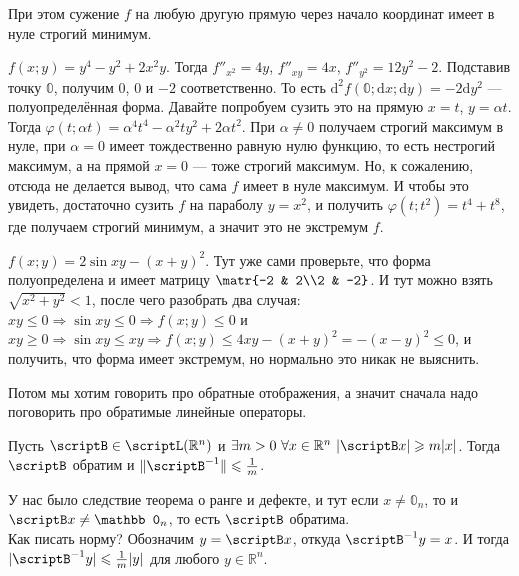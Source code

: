 \documentclass{article}
\begin{document}
\begin{itemize}
\begin{Example}
            При этом сужение $f$ на любую другую прямую через начало координат имеет в нуле строгий минимум.
        \end{Example}
        \begin{Example}
            $f(x;y)=y^4-y^2+2x^2y$. Тогда $f''_{x^2}=4y$, $f''_{xy}=4x$, $f''_{y^2}=12y^2-2$. Подставив точку $\mathbb0$, получим $0$, $0$ и $-2$ соответственно. То есть $\mathrm d^2f(\mathbb0;\mathrm dx;\mathrm dy)=-2\mathrm dy^2$ --- полуопределённая форма. Давайте попробуем сузить это на прямую $x=t$, $y=\alpha t$. Тогда $\varphi(t;\alpha t)=\alpha^4t^4-\alpha^2ty^2+2\alpha t^2$. При $\alpha\neq0$ получаем строгий максимум в нуле, при $\alpha=0$ имеет тождественно равную нулю функцию, то есть нестрогий максимум, а на прямой $x=0$ --- тоже строгий максимум. Но, к сожалению, отсюда не делается вывод, что сама $f$ имеет в нуле максимум. И чтобы это увидеть, достаточно сузить $f$ на параболу $y=x^2$, и получить $\varphi(t;t^2)=t^4+t^8$, где получаем строгий минимум, а значит это не экстремум $f$.
        \end{Example}
        \begin{Example}
            $f(x;y)=2\sin xy-(x+y)^2$. Тут уже сами проверьте, что форма полуопределена и имеет матрицу $\matr{-2 & 2\\2 & -2}$. И тут можно взять $\sqrt{x^2+y^2}<1$, после чего разобрать два случая: $xy\leqslant0\Rightarrow\sin xy\leqslant0\Rightarrow f(x;y)\leqslant0$ и $xy\geqslant0\Rightarrow\sin xy\leqslant xy\Rightarrow f(x;y)\leqslant 4xy-(x+y)^2=-(x-y)^2\leqslant0$, и получить, что форма имеет экстремум, но нормально это никак не выяснить.
        \end{Example}
        \begin{Comment}
            Потом мы хотим говорить про обратные отображения, а значит сначала надо поговорить про обратимые линейные операторы.
        \end{Comment}
        \thm Пусть $\scriptB\in\scriptL(\mathbb R^n)$ и $\exists m>0~\forall x\in\mathbb R^n~|\scriptB x|\geqslant m|x|$. Тогда $\scriptB$ обратим и $\|\scriptB^{-1}\|\leqslant\frac1m$.
        \begin{Proof}
            У нас было следствие теорема о ранге и дефекте, и тут если $x\neq\mathbb0_n$, то и $\scriptB x\neq\mathbb0_n$, то есть $\scriptB$ обратима.\\
            Как писать норму? Обозначим $y=\scriptB x$, откуда $\scriptB^{-1}y=x$. И тогда $|\scriptB^{-1}y|\leqslant\frac1m|y|$ для любого $y\in\mathbb R^n$.
        \end{Proof}

\end{itemize}
\end{document}
